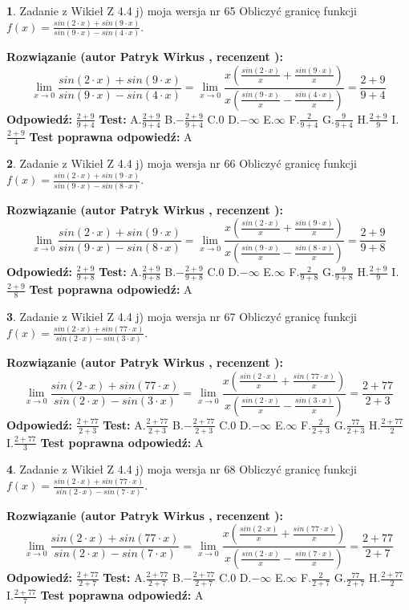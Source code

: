 \documentclass[12pt, a4paper]{article}
\theoremstyle{definition} %
\newtheorem{zad}{}
\newcommand{\zadStart}[1]{\begin{zad}#1\newline}
\newcommand{\zadStop}{\end{zad}}
\newcommand{\rozwStart}[2]{\noindent \textbf{Rozwiązanie (autor #1 , recenzent #2): }\newline}
\newcommand{\rozwStop}{\newline}
\newcommand{\odpStart}{\noindent \textbf{Odpowiedź:}\newline}
\newcommand{\odpStop}{\newline}
\newcommand{\testStart}{\noindent \textbf{Test:}\newline}
\newcommand{\testStop}{\newline}
\newcommand{\kluczStart}{\noindent \textbf{Test poprawna odpowiedź:}\newline}
\newcommand{\kluczStop}{\newline}
\begin{document}
\zadStart{Zadanie z Wikieł Z 4.4 j) moja wersja nr 65}
Obliczyć granicę funkcji $f(x)=\frac{sin(2\cdot x) +sin(9\cdot x)}{sin(9\cdot x) -sin(4\cdot x)}$.
\zadStop
\rozwStart{Patryk Wirkus}{}
$$\lim\limits_{x\to 0}\frac{sin(2\cdot x) +sin(9\cdot x)}{sin(9\cdot x) -sin(4\cdot x)}=\lim\limits_{x\to 0}\frac{x(\frac{sin(2\cdot x)}{x}+\frac{sin(9\cdot x)}{x})}{x(\frac{sin(9\cdot x)}{x}-\frac{sin(4\cdot x)}{x})}=\frac{2+9}{9+4}$$
\rozwStop
\odpStart
$\frac{2+9}{9+4}$
\odpStop
\testStart
A.$\frac{2+9}{9+4}$
B.$-\frac{2+9}{9+4}$
C.$0$
D.$-\infty$
E.$\infty$
F.$\frac{2}{9+4}$
G.$\frac{9}{9+4}$
H.$\frac{2+9}{9}$
I.$\frac{2+9}{4}$
\testStop
\kluczStart
A
\kluczStop



\zadStart{Zadanie z Wikieł Z 4.4 j) moja wersja nr 66}
Obliczyć granicę funkcji $f(x)=\frac{sin(2\cdot x) +sin(9\cdot x)}{sin(9\cdot x) -sin(8\cdot x)}$.
\zadStop
\rozwStart{Patryk Wirkus}{}
$$\lim\limits_{x\to 0}\frac{sin(2\cdot x) +sin(9\cdot x)}{sin(9\cdot x) -sin(8\cdot x)}=\lim\limits_{x\to 0}\frac{x(\frac{sin(2\cdot x)}{x}+\frac{sin(9\cdot x)}{x})}{x(\frac{sin(9\cdot x)}{x}-\frac{sin(8\cdot x)}{x})}=\frac{2+9}{9+8}$$
\rozwStop
\odpStart
$\frac{2+9}{9+8}$
\odpStop
\testStart
A.$\frac{2+9}{9+8}$
B.$-\frac{2+9}{9+8}$
C.$0$
D.$-\infty$
E.$\infty$
F.$\frac{2}{9+8}$
G.$\frac{9}{9+8}$
H.$\frac{2+9}{9}$
I.$\frac{2+9}{8}$
\testStop
\kluczStart
A
\kluczStop



\zadStart{Zadanie z Wikieł Z 4.4 j) moja wersja nr 67}
Obliczyć granicę funkcji $f(x)=\frac{sin(2\cdot x) +sin(77\cdot x)}{sin(2\cdot x) -sin(3\cdot x)}$.
\zadStop
\rozwStart{Patryk Wirkus}{}
$$\lim\limits_{x\to 0}\frac{sin(2\cdot x) +sin(77\cdot x)}{sin(2\cdot x) -sin(3\cdot x)}=\lim\limits_{x\to 0}\frac{x(\frac{sin(2\cdot x)}{x}+\frac{sin(77\cdot x)}{x})}{x(\frac{sin(2\cdot x)}{x}-\frac{sin(3\cdot x)}{x})}=\frac{2+77}{2+3}$$
\rozwStop
\odpStart
$\frac{2+77}{2+3}$
\odpStop
\testStart
A.$\frac{2+77}{2+3}$
B.$-\frac{2+77}{2+3}$
C.$0$
D.$-\infty$
E.$\infty$
F.$\frac{2}{2+3}$
G.$\frac{77}{2+3}$
H.$\frac{2+77}{2}$
I.$\frac{2+77}{3}$
\testStop
\kluczStart
A
\kluczStop



\zadStart{Zadanie z Wikieł Z 4.4 j) moja wersja nr 68}
Obliczyć granicę funkcji $f(x)=\frac{sin(2\cdot x) +sin(77\cdot x)}{sin(2\cdot x) -sin(7\cdot x)}$.
\zadStop
\rozwStart{Patryk Wirkus}{}
$$\lim\limits_{x\to 0}\frac{sin(2\cdot x) +sin(77\cdot x)}{sin(2\cdot x) -sin(7\cdot x)}=\lim\limits_{x\to 0}\frac{x(\frac{sin(2\cdot x)}{x}+\frac{sin(77\cdot x)}{x})}{x(\frac{sin(2\cdot x)}{x}-\frac{sin(7\cdot x)}{x})}=\frac{2+77}{2+7}$$
\rozwStop
\odpStart
$\frac{2+77}{2+7}$
\odpStop
\testStart
A.$\frac{2+77}{2+7}$
B.$-\frac{2+77}{2+7}$
C.$0$
D.$-\infty$
E.$\infty$
F.$\frac{2}{2+7}$
G.$\frac{77}{2+7}$
H.$\frac{2+77}{2}$
I.$\frac{2+77}{7}$
\testStop
\kluczStart
A
\kluczStop
\end{document}
